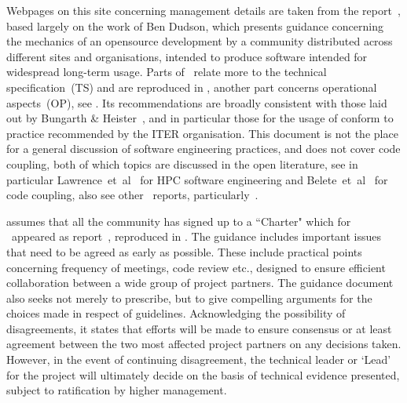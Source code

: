Webpages on this site concerning management details are taken from the
report~\cite{y3re314}, based largely on the work of Ben Dudson, which
presents guidance concerning the mechanics of an opensource development
by a community distributed  across different sites and organisations,
intended to produce software intended for widespread long-term usage.
Parts of~\cite{y3re314} relate more to 
the technical specification~(TS) and are reproduced in ,
another part concerns operational aspects~(OP), see .
Its recommendations are broadly consistent with those laid out by Bungarth \&
Heister~\cite{Ba13What}, and in particular those for the usage of 
conform to practice recommended by the ITER organisation.
This document is not the place for a general discussion of software engineering practices,
and does not cover code coupling, both of which topics are discussed in the open literature,
see in particular Lawrence~et~al~\cite{La18Cros} for HPC software engineering and
Belete~et~al~\cite{Be17over} for code coupling,
also see other \nep \ reports, particularly~\cite{y2re312,y2re333,y3re72}.

\cite{y3re314} assumes that all the community has signed up to a ``Charter"
which for \nep \ appeared as report~\cite{charter}, reproduced in .
The guidance\cite{y3re314}  includes  important issues that need to be agreed as early as possible.
These include practical points concerning frequency of meetings, code review etc.,
designed to ensure efficient collaboration between a wide group of project partners. 
The guidance document\cite{y3re314} also seeks not merely to prescribe, but to
give compelling arguments for the choices made in respect of guidelines.
Acknowledging the possibility of disagreements, it states that efforts will be made to ensure
consensus or at least agreement between the two most affected project partners
on any decisions taken. However, in the event of continuing disagreement, the technical
leader or `Lead' for the project will ultimately decide on the basis of technical
evidence presented, subject to ratification by higher management.

